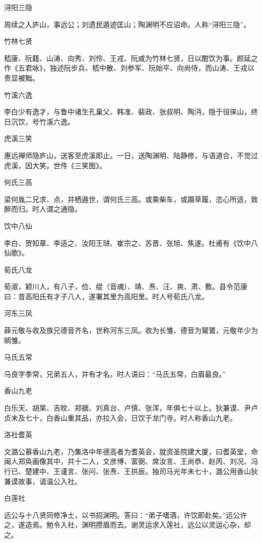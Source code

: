 \documentclass[a4paper,12pt,UTF8,twoside]{ctexbook}
\begin{document}
    浔阳三隐
    
    周续之入庐山，事远公；刘遗民遁迹匡山；陶渊明不应诏命。人称“浔阳三隐”。
    
    竹林七贤
    
    嵇康、阮籍、山涛、向秀、刘伶、王戎、阮咸为竹林七贤，日以酣饮为事。颜延之作《五君咏》，独述阮步兵、嵇中散、刘参军、阮始平、向尚侍，而山涛、王戎以贵显被黜。
    
    竹溪六逸
    
    李白少有逸才，与鲁中诸生孔巢父、韩准、裴政、张叔明、陶沔，隐于徂徕山，终日沉饮，号竹溪六逸。
    
    虎溪三笑
    
    惠远禅师隐庐山，送客至虎溪即止。一日，送陶渊明、陆静修，与语道合，不觉过虎溪，因大笑。世传《三笑图》。
    
    何氏三高
    
    梁何胤二兄求、点，并栖遁世，谓何氏三高。或乘柴车，或蹑草履，恣心所适，致醉而归。时人谓之通隐。
    
    饮中八仙
    
    李白、贺知章、李适之、汝阳王琎、崔宗之、苏晋、张旭、焦遂。杜甫有《饮中八仙歌》。
    
    荀氏八龙
    
    荀淑，颖川人，有八子，俭、绲（音魂）、靖、焘、汪、爽、肃、敷。县令范康曰：昔高阳氏有才子八人，遂署其里为高阳里。时人号荀氏八龙。
    
    河东三凤
    
    薛元敬与收及族兄德音齐名，世称河东三凤。收为长雏、德音为鸑鷟，元敬年少为鹓雏。
    
    马氏五常
    
    马良字季常，兄弟五人，并有才名。时人语曰：“马氏五常，白眉最良。”
    
    香山九老
    
    白乐天、胡杲、吉旼、郑据、刘真台、卢慎、张浑，年俱七十以上。狄兼谟、尹卢贞未及七十，白香山重其品，亦拉入会，日饮于龙门寺。时人称香山九老。
    
    洛社耆英
    
    文潞公慕香山九老，乃集洛中年德高者为耆英会，就资圣院建大厦，曰耆英堂，命闽人郑奂画像其中，共十二人，文彦博、富弼、席汝言、王尚恭、赵丙、刘况、冯行已、楚建中、王谨言、张问、张焘、王拱辰。独司马光年未七十，潞公用香山狄兼谟故事，请温公入社。
    
    白莲社
    
    远公与十八贤同修净土，以书招渊明。答曰：“弟子嗜酒，许饮即赴矣。”远公许之，遂造焉。勉令入社，渊明攒眉而去。谢灵运求入莲社，远公以灵运心杂，却之。
    
\end{document}
